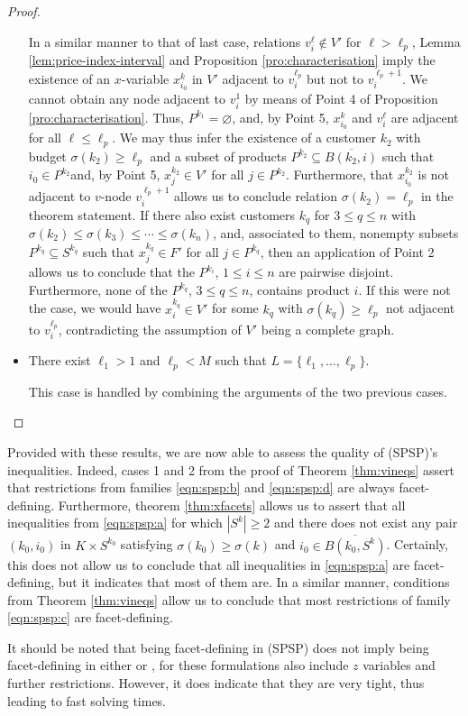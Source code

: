 \begin{proof}
\begin{itemize}
	    In a similar manner to that of last case, relations $v_i^\ell \notin
	    V'$ for $\ell > \ell_p$, Lemma \ref{lem:price-index-interval} and
	    Proposition \ref{pro:characterisation} imply the existence of an
	    $x$-variable $x_{i_0}^k$ in $V'$ adjacent to $v_i^{\ell_p}$ but not
	    to $v_i^{\ell_p+1}$. We cannot obtain any node adjacent to $v_i^1$
	    by means of Point 4 of Proposition \ref{pro:characterisation}. Thus,
	    $P^{k_1} = \varnothing$, and, by Point 5, $x_{i_0}^k$ and $v_i^\ell$
	    are adjacent for all $\ell \leq \ell_p$. We may thus infer the
	    existence of a customer $k_2$ with budget $\sigma(k_2) \geq \ell_p$
	    and a subset of products $P^{k_2} \subseteq \overline{B(k_2, i)}$
	    such that $i_0 \in P^{k_2}$and, by Point 5, $x_j^{k_2} \in V'$ for
	    all $j \in P^{k_2}$. Furthermore, that $x_{i_0}^{k_2}$ is not
	    adjacent to $v$-node $v_i^{\ell_p+1}$ allows us to conclude relation
	    $\sigma(k_2) = \ell_p$ in the theorem statement. If there also exist
	    customers $k_q$ for $3 \leq q \leq n$ with $\sigma(k_2) \leq
	    \sigma(k_3) \leq \cdots \leq \sigma(k_n)$, and, associated to them,
	    nonempty subsets $P^{k_q} \subseteq S^{k_q}$ such that $x_j^{k_q}
	    \in F'$ for all $j \in P^{k_q}$, then an application of Point 2
	    allows us to conclude that the $P^{k_i}$, $1 \leq i \leq n$ are
	    pairwise disjoint. Furthermore, none of the $P^{k_q}$, $3 \leq q
	    \leq n$, contains product $i$. If this were not the case, we would
	    have $x_i^{k_q} \in V'$ for some $k_q$ with $\sigma(k_q) \geq
	    \ell_p$ not adjacent to $v_i^{\ell_p}$, contradicting the assumption
	    of $V'$ being a complete graph.
	\item
	    There exist $\ell_1 > 1$ and $\ell_p < M$ such that $L = \{\ell_1,
	    \ldots, \ell_p\}$.

	    This case is handled by combining the arguments of the two previous
	    cases.
    \end{itemize}
\end{proof}

Provided with these results, we are now able to assess the quality of (SPSP)'s
inequalities. Indeed, cases 1 and 2 from the proof of Theorem \ref{thm:vineqs}
assert that restrictions from families \eqref{eqn:spsp:b} and \eqref{eqn:spsp:d}
are always facet-defining. Furthermore, theorem \ref{thm:xfacets} allows us to
assert that all inequalities from \eqref{eqn:spsp:a} for which $|S^k| \geq 2$
and there does not exist any pair $(k_0, i_0)$ in $K \times S^{k_0}$ satisfying
$\sigma(k_0) \geq \sigma(k)$ and $i_0 \in \overline{B(k_0, S^k)}$. Certainly,
this does not allow us to conclude that all inequalities in \eqref{eqn:spsp:a}
are facet-defining, but it indicates that most of them are. In a similar manner,
conditions from Theorem \ref{thm:vineqs} allow us to conclude that most
restrictions of family \eqref{eqn:spsp:c} are facet-defining.

It should be noted that being facet-defining in (SPSP) does not imply being
facet-defining in either \slla or \sllb, for these formulations also include $z$
variables and further restrictions. However, it does indicate that they are very
tight, thus leading to fast solving times.
